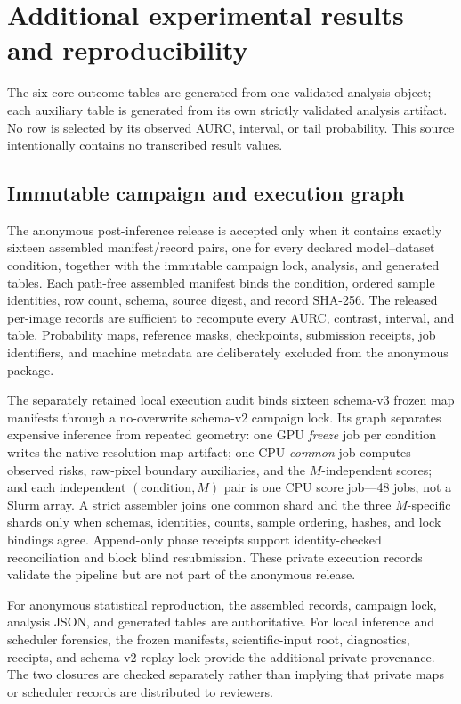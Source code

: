 \section{Additional experimental results and reproducibility}
\label{app:additional-results}

The six core outcome tables are generated from one validated analysis object;
each auxiliary table is generated from its own strictly validated analysis
artifact. No row is selected by its observed AURC, interval, or tail
probability. This source intentionally contains no transcribed result values.

\subsection{Immutable campaign and execution graph}

The anonymous post-inference release is accepted only when it contains exactly
sixteen assembled manifest/record pairs, one for every declared
model--dataset condition, together with the immutable campaign lock, analysis,
and generated tables. Each path-free assembled manifest binds the condition,
ordered sample identities, row count, schema, source digest, and record
SHA-256. The released per-image records are sufficient to recompute every AURC,
contrast, interval, and table. Probability maps, reference masks, checkpoints,
submission receipts, job identifiers, and machine metadata are deliberately
excluded from the anonymous package.

The separately retained local execution audit binds sixteen schema-v3 frozen
map manifests through a no-overwrite schema-v2 campaign lock. Its graph
separates expensive inference from repeated geometry: one GPU \emph{freeze}
job per condition writes the native-resolution map artifact; one CPU
\emph{common} job computes observed risks, raw-pixel boundary auxiliaries, and
the \(M\)-independent scores; and each independent
\((\text{condition},M)\) pair is one CPU score job---48 jobs, not a Slurm
array. A strict assembler joins one common shard and the three \(M\)-specific
shards only when schemas, identities, counts, sample ordering, hashes, and lock
bindings agree. Append-only phase receipts support identity-checked
reconciliation and block blind resubmission. These private execution records
validate the pipeline but are not part of the anonymous release.

For anonymous statistical reproduction, the assembled records, campaign lock,
analysis JSON, and generated tables are authoritative. For local inference and
scheduler forensics, the frozen manifests, scientific-input root, diagnostics,
receipts, and schema-v2 replay lock provide the additional private provenance.
The two closures are checked separately rather than implying that private maps
or scheduler records are distributed to reviewers.

